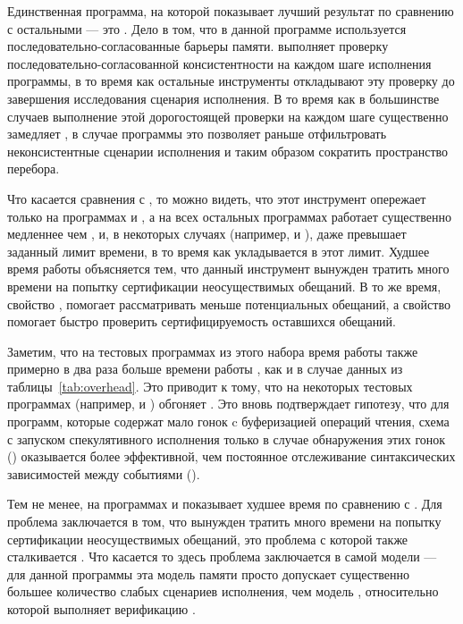 

Единственная программа, на которой \Nidhugg показывает 
лучший результат по сравнению с остальными --- это .
Дело в том, что в данной программе используется 
последовательно-согласованные барьеры памяти.
\Nidhugg выполняет проверку последовательно-согласованной
консистентности на каждом шаге исполнения программы, в то время 
как остальные инструменты откладывают эту проверку 
до завершения исследования сценария исполнения. 
В то время как в большинстве случаев выполнение этой дорогостоящей проверки 
на каждом шаге существенно замедляет \Nidhugg, 
в случае программы  это позволяет 
раньше отфильтровать неконсистентные сценарии исполнения 
и таким образом сократить пространство перебора. 

Что касается сравнения с \CDSChecker, то можно видеть,
что этот инструмент опережает \wmc только 
на программах  и , 
а на всех остальных программах \CDSChecker работает существенно 
медленнее чем \wmc, и, в некоторых случаях 
(например,  и ), 
даже превышает заданный лимит времени, в то время как 
\wmc укладывается в этот лимит.
Худшее время работы \CDSChecker объясняется тем, что 
данный инструмент вынужден тратить много времени 
на попытку сертификации неосуществимых обещаний. 
В то же время, свойство \LBRF, помогает \wmc 
рассматривать меньше потенциальных обещаний, 
а свойство \CL помогает быстро проверить 
сертифицируемость оставшихся обещаний.  

Заметим, что на тестовых программах из этого набора 
время работы \hmc также примерно в два раза больше времени работы \genmc, 
как и в случае данных из таблицы~\ref{tab:overhead}.
Это приводит к тому, что на некоторых тестовых программах 
(например,  и ) \wmc обгоняет \hmc.
Это вновь подтверждает гипотезу, что для программ, 
которые содержат мало гонок c буферизацией операций чтения, 
схема с запуском спекулятивного исполнения только в случае 
обнаружения этих гонок (\wmc) оказывается более эффективной, 
чем постоянное отслеживание синтаксических зависимостей между событиями (\hmc). 

Тем не менее, на программах  и 
\wmc показывает худшее время по сравнению с \hmc.
Для  проблема заключается в том, 
что \wmc вынужден тратить много времени 
на попытку сертификации неосуществимых обещаний, 
это проблема с которой также сталкивается \CDSChecker.
Что касается  то здесь проблема 
заключается в самой модели \WkmS --- для 
данной программы эта модель памяти просто допускает 
существенно большее количество слабых сценариев исполнения, 
чем модель \IMM, относительно которой выполняет верификацию \hmc. 

